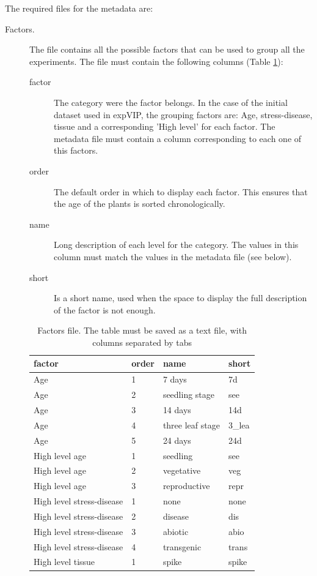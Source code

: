 The required files for the metadata are:
\begin{description}
\item[Factors.] The file contains all the possible factors that can be used to group all the experiments. The file must contain the following columns (Table \ref{tab:exp:factors}):
\begin{description}
\item[factor] The category were the factor belongs. In the case of the initial dataset used in expVIP, the grouping factors are: Age, stress-disease, tissue and a corresponding 'High level' for each factor. The metadata file must contain a column corresponding to each one of this factors. 
\item[order] The default order in which to display each factor. This ensures that the age of the plants is sorted chronologically. 
\item[name] Long description of each level for the category. The values in this column must match the values in the metadata file (see below).
\item[short] Is a short name, used when the space to display the full description of the factor is not enough.
\end{description}
\begin{table}
\centering
\caption[Factors file]{Factors file. The table must be saved as a text file, with columns separated by tabs}
\label{tab:exp:factors}
\begin{tabular}{llll}
\toprule
factor & order & name & short \\
\midrule
Age & 1 & 7 days & 7d \\
Age & 2 & seedling stage & see \\
Age & 3 & 14 days & 14d \\
Age & 4 & three leaf stage & 3\_lea \\
Age & 5 & 24 days & 24d \\
High level age & 1 & seedling & see \\
High level age & 2 & vegetative & veg \\
High level age & 3 & reproductive & repr \\
High level stress-disease & 1 & none & none \\
High level stress-disease & 2 & disease & dis \\
High level stress-disease & 3 & abiotic & abio \\
High level stress-disease & 4 & transgenic & trans \\
High level tissue & 1 & spike & spike \\

\end{tabular}
\end{table}
\end{description}
